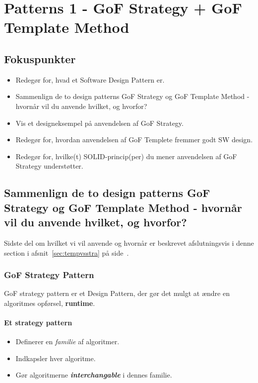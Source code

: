 \section{Patterns 1 - GoF Strategy + GoF Template Method}

\subsection{Fokuspunkter}

\begin{itemize}
	\item Redegør for, hvad et Software Design Pattern er.
	\item Sammenlign de to design patterns GoF Strategy og GoF Template Method - hvornår vil du anvende hvilket, og hvorfor?
	\item Vis et designeksempel på anvendelsen af GoF Strategy.
	\item Redegør for, hvordan anvendelsen af GoF Templete fremmer godt SW design.
	\item Redegør for, hvilke(t) SOLID-princip(per) du mener anvendelsen af GoF Strategy understøtter.
\end{itemize}



\subsection{Sammenlign de to design patterns GoF Strategy og GoF Template Method - hvornår vil du anvende hvilket, og hvorfor?}
Sidste del om hvilket vi vil anvende og hvornår er beskrevet afslutningsvis i denne section i afsnit~\ref{sec:tempvsstra} på side~\pageref{sec:tempvsstra}.

\subsubsection{GoF Strategy Pattern}
GoF strategy pattern er et Design Pattern, der gør det mulgt at ændre en algoritmes opførsel, \textbf{runtime}.

\paragraph{Et strategy pattern}
\begin{itemize}
	\item Definerer en \textit{familie} af algoritmer.
	\item Indkapsler hver algoritme.
	\item Gør algoritmerne \textbf{\textit{interchangable}} i dennes familie.
\end{itemize}


